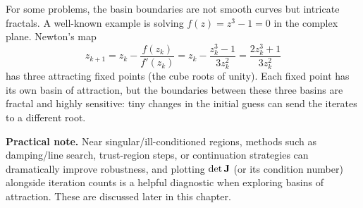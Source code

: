 \begin{exampleBox}
\begin{center}
    \end{center}
\end{exampleBox}

For some problems, the basin boundaries are not smooth curves but intricate fractals. A well-known example is solving \(f(z)=z^3-1=0\) in the complex plane. Newton's map
\begin{equation}
z_{k+1}=z_k-\frac{f(z_k)}{f'(z_k)}=z_k-\frac{z_k^3-1}{3z_k^2}=\frac{2z_k^3+1}{3z_k^2}
\end{equation}
has three attracting fixed points (the cube roots of unity). Each fixed point has its own basin of attraction, but the boundaries between these three basins are fractal and highly sensitive: tiny changes in the initial guess can send the iterates to a different root.


\textbf{Practical note.} Near singular/ill-conditioned regions, methods such as damping/line search, trust-region steps, or continuation strategies can dramatically improve robustness, and plotting \(\det\mathbf{J}\) (or its condition number) alongside iteration counts is a helpful diagnostic when exploring basins of attraction. These are discussed later in this chapter.



